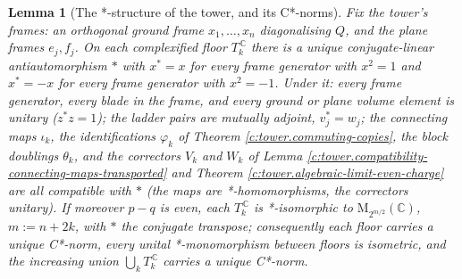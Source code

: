 \documentclass[11pt]{article}
\newtheorem{lemma}[theorem]{Lemma}
\theoremstyle{definition}
\theoremstyle{plain}
\providecommand{\C}{}\renewcommand{\C}{\mathbb{C}}
\providecommand{\Mat}{}\renewcommand{\Mat}{\mathrm{M}}
\begin{document}
\begin{lemma}[The *-structure of the tower, and its C*-norms]\label{c:tower.structure-tower-c-norms}
Fix the tower's frames: an orthogonal ground frame $x_1, \dots, x_n$ diagonalising $Q$, and the plane frames $e_j, f_j$. On each complexified floor $T_k^{\,\C}$ there is a unique conjugate-linear antiautomorphism $*$ with $x^* = x$ for every frame generator with $x^2 = 1$ and $x^* = -x$ for every frame generator with $x^2 = -1$. Under it: every frame generator, every blade in the frame, and every ground or plane volume element is unitary ($z^* z = 1$); the ladder pairs are mutually adjoint, $v_j^* = w_j$; the connecting maps $\iota_k$, the identifications $\varphi_k$ of Theorem \ref{c:tower.commuting-copies}, the block doublings $\theta_k$, and the correctors $V_k$ and $W_k$ of Lemma \ref{c:tower.compatibility-connecting-maps-transported} and Theorem \ref{c:tower.algebraic-limit-even-charge} are all compatible with $*$ (the maps are *-homomorphisms, the correctors unitary). If moreover $p - q$ is even, each $T_k^{\,\C}$ is *-isomorphic to $\Mat_{2^{m/2}}(\C)$, $m := n + 2k$, with $*$ the conjugate transpose; consequently each floor carries a unique C*-norm, every unital *-monomorphism between floors is isometric, and the increasing union $\bigcup_k T_k^{\,\C}$ carries a unique C*-norm.
\end{lemma}
\end{document}
